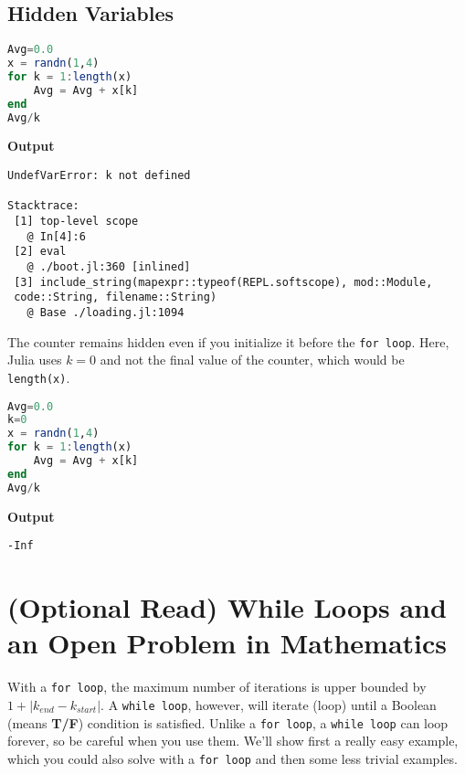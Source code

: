 \subsection{Hidden Variables}

\begin{lstlisting}[language=Julia,style=mystyle]
Avg=0.0
x = randn(1,4)
for k = 1:length(x)
    Avg = Avg + x[k]
end
Avg/k
\end{lstlisting}
\textbf{Output} 
\begin{verbatim}
UndefVarError: k not defined

Stacktrace:
 [1] top-level scope
   @ In[4]:6
 [2] eval
   @ ./boot.jl:360 [inlined]
 [3] include_string(mapexpr::typeof(REPL.softscope), mod::Module, 
 code::String, filename::String)
   @ Base ./loading.jl:1094
\end{verbatim}

The counter remains hidden even if you initialize it before the \texttt{for\,loop}. Here, Julia uses $k=0$ and not the final value of the counter, which would be \texttt{length(x)}.

\begin{lstlisting}[language=Julia,style=mystyle]
Avg=0.0
k=0
x = randn(1,4)
for k = 1:length(x)
    Avg = Avg + x[k]
end
Avg/k
\end{lstlisting}
\textbf{Output} 
\begin{verbatim}
-Inf
\end{verbatim}






\section{(Optional Read) While Loops and an Open Problem in Mathematics}

With a \texttt{for\,loop}, the maximum number of iterations is upper bounded by $1+|k_{end}-k_{start}|$. A \texttt{while\,loop}, however, will iterate (loop) until a Boolean (means \textbf{T/F}) condition is satisfied. Unlike a \texttt{for\,loop}, a \texttt{while\,loop} can loop forever, so be careful when you use them. We'll show first a really easy example, which you could also solve with a \texttt{for\,loop} and then some less trivial examples.\\


